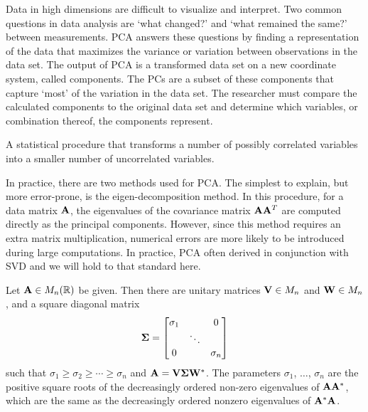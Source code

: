 Data in high dimensions are difficult to visualize and interpret.  Two common questions in data analysis are `what changed?' and `what
remained the same?' between measurements.  \gls{PCA} answers these questions by finding a representation of the data that maximizes
the \gls{variance} or variation between observations in the data set.  The output of \gls{PCA} is a transformed data set on a new coordinate
system, called components.  The \glspl{PC} are a subset of these components that capture `most' of the variation in the data set.  The researcher
must compare the calculated components to the original data set and determine which variables, or combination thereof, the components represent.

\begin{defn}
  A statistical procedure that transforms a number of possibly correlated variables into a smaller number of uncorrelated variables.
\end{defn}

In practice, there are two methods used for \gls{PCA}.  The simplest to explain, but more error-prone, is the eigen-decomposition
method\cite{smith2006}.  In this procedure, for a data matrix $\mathbf{A}$, the eigenvalues of the covariance matrix $\mathbf{A}\mathbf{A}^T$
are computed directly as the principal components.  However, since this method requires an extra matrix multiplication, numerical
errors are more likely to be introduced during large computations. In practice, \gls{PCA} often derived in conjunction with \gls{SVD}
and we will hold to that standard here.

\begin{thm}
  Let $\mathbf{A} \in M_{n}(\mathbb{R})$ be given. Then there are unitary matrices $\mathbf{V} \in M_n$ and $\mathbf{W} \in M_n$, and a square diagonal
  matrix
  \[
    \mathbf{\Sigma} =
      \begin{bmatrix}
        \sigma_1 &        & 0        \\
                 & \ddots &          \\
        0        &        & \sigma_n \\
      \end{bmatrix}
  \]
  such that $\sigma_1 \geq \sigma_2 \geq \cdots \geq \sigma_n$ and $\mathbf{A} = \mathbf{V}\mathbf{\Sigma}\mathbf{W}^*$.  The parameters $\sigma_1$,
  $\hdots$, $\sigma_n$ are the positive square roots of the decreasingly ordered non-zero eigenvalues of $\mathbf{A}\mathbf{A}^*$, which are the
  same as the decreasingly ordered nonzero eigenvalues of $\mathbf{A}^*\mathbf{A}$.
\end{thm}

